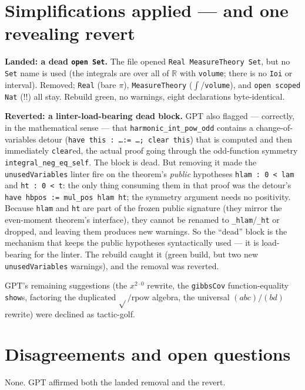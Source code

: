 \documentclass[11pt]{article}
\begin{document}
\section{Simplifications applied --- and one revealing revert}
\textbf{Landed: a dead \texttt{open Set}.} The file opened \texttt{Real MeasureTheory Set}, but no \texttt{Set}
name is used (the integrals are over all of $\mathbb R$ with \texttt{volume}; there is no \texttt{Ioi} or
interval). Removed; \texttt{Real} (bare $\pi$), \texttt{MeasureTheory} ($\int$/\texttt{volume}), and
\texttt{open scoped Nat} ($!!$) all stay. Rebuild green, no warnings, eight declarations byte-identical.

\textbf{Reverted: a linter-load-bearing dead block.} GPT also flagged --- correctly, in the mathematical sense
--- that \texttt{harmonic\_int\_pow\_odd} contains a change-of-variables detour (\texttt{have this : \dots :=
\dots; clear this}) that is computed and then immediately \texttt{clear}ed, the actual proof going through the
odd-function symmetry \texttt{integral\_neg\_eq\_self}. The block is dead. But removing it made the
\texttt{unusedVariables} linter fire on the theorem's \emph{public} hypotheses \texttt{hlam : 0 < lam} and
\texttt{ht : 0 < t}: the only thing consuming them in that proof was the detour's
\texttt{have hbpos := mul\_pos hlam ht}; the symmetry argument needs no positivity. Because \texttt{hlam} and
\texttt{ht} are part of the frozen public signature (they mirror the even-moment theorem's interface), they
cannot be renamed to \texttt{\_hlam}/\texttt{\_ht} or dropped, and leaving them produces new warnings. So the
``dead'' block is the mechanism that keeps the public hypotheses syntactically used --- it is load-bearing for
the linter. The rebuild caught it (green build, but two new \texttt{unusedVariables} warnings), and the
removal was reverted.

GPT's remaining suggestions (the $x^{2\cdot0}$ rewrite, the \texttt{gibbsCov} function-equality \texttt{show}s,
factoring the duplicated $\sqrt{}/\mathrm{rpow}$ algebra, the universal $(a b c)/(b d)$ rewrite) were declined
as tactic-golf.

\section{Disagreements and open questions}
None. GPT affirmed both the landed removal and the revert.
\end{document}

